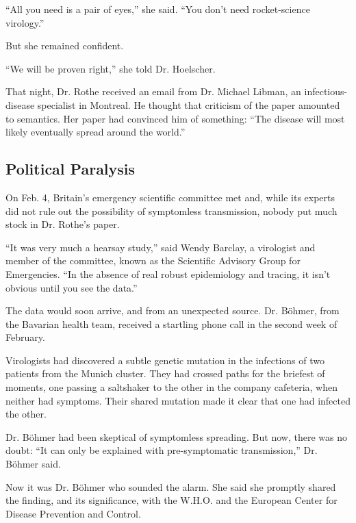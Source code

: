 ``All you need is a pair of eyes,'' she said. ``You don't need
rocket-science virology.''

But she remained confident.

``We will be proven right,'' she told Dr. Hoelscher.

That night, Dr. Rothe received an email from Dr. Michael Libman, an
infectious-disease specialist in Montreal. He thought that criticism of
the paper amounted to semantics. Her paper had convinced him of
something: ``The disease will most likely eventually spread around the
world.''

\hypertarget{political-paralysis}{%
\subsection{Political Paralysis}\label{political-paralysis}}

On Feb. 4, Britain's emergency scientific committee met and, while its
experts did not rule out the possibility of symptomless transmission,
nobody put much stock in Dr. Rothe's paper.

``It was very much a hearsay study,'' said Wendy Barclay, a virologist
and member of the committee, known as the Scientific Advisory Group for
Emergencies. ``In the absence of real robust epidemiology and tracing,
it isn't obvious until you see the data.''

The data would soon arrive, and from an unexpected source. Dr. Böhmer,
from the Bavarian health team, received a startling phone call in the
second week of February.

Virologists had discovered a subtle genetic mutation in the infections
of two patients from the Munich cluster. They had crossed paths for the
briefest of moments, one passing a saltshaker to the other in the
company cafeteria, when neither had symptoms. Their shared mutation made
it clear that one had infected the other.

Dr. Böhmer had been skeptical of symptomless spreading. But now, there
was no doubt: ``It can only be explained with pre-symptomatic
transmission,'' Dr. Böhmer said.

Now it was Dr. Böhmer who sounded the alarm. She said she promptly
shared the finding, and its significance, with the W.H.O. and the
European Center for Disease Prevention and Control.

\href{https://www.nytimes.com/news-event/coronavirus?action=click\&pgtype=Article\&state=default\&region=MAIN_CONTENT_3\&context=storylines_faq}{}

